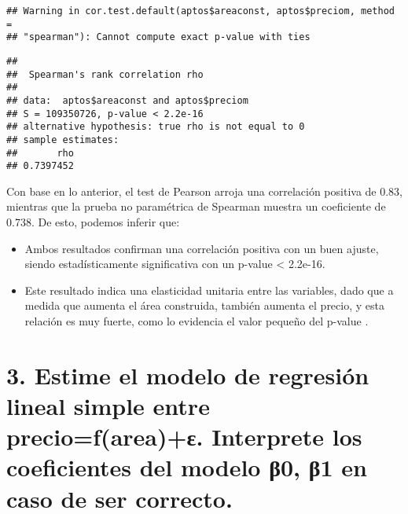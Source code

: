 \documentclass[
]{article}
\newenvironment{Shaded}{\begin{snugshade}}{\end{snugshade}}
\newcommand{\AttributeTok}[1]{\textcolor[rgb]{0.13,0.29,0.53}{#1}}
\newcommand{\FunctionTok}[1]{\textcolor[rgb]{0.13,0.29,0.53}{\textbf{#1}}}
\newcommand{\NormalTok}[1]{#1}
\newcommand{\SpecialCharTok}[1]{\textcolor[rgb]{0.81,0.36,0.00}{\textbf{#1}}}
\newcommand{\StringTok}[1]{\textcolor[rgb]{0.31,0.60,0.02}{#1}}
\providecommand{\tightlist}{%
  \setlength{\itemsep}{0pt}\setlength{\parskip}{0pt}}
\begin{document}
\begin{Shaded}
\end{Shaded}

\begin{verbatim}
## Warning in cor.test.default(aptos$areaconst, aptos$preciom, method =
## "spearman"): Cannot compute exact p-value with ties
\end{verbatim}

\begin{verbatim}
## 
##  Spearman's rank correlation rho
## 
## data:  aptos$areaconst and aptos$preciom
## S = 109350726, p-value < 2.2e-16
## alternative hypothesis: true rho is not equal to 0
## sample estimates:
##       rho 
## 0.7397452
\end{verbatim}

Con base en lo anterior, el test de Pearson arroja una correlación
positiva de 0.83, mientras que la prueba no paramétrica de Spearman
muestra un coeficiente de 0.738. De esto, podemos inferir que:

\begin{itemize}
\tightlist
\item
  Ambos resultados confirman una correlación positiva con un buen
  ajuste, siendo estadísticamente significativa con un p-value
  \textless{} 2.2e-16.
\item
  Este resultado indica una elasticidad unitaria entre las variables,
  dado que a medida que aumenta el área construida, también aumenta el
  precio, y esta relación es muy fuerte, como lo evidencia el valor
  pequeño del p-value .
\end{itemize}

\section{\texorpdfstring{\textbf{3. Estime el modelo de regresión lineal
simple entre precio=f(area)+ε. Interprete los coeficientes del modelo
β0, β1 en caso de ser
correcto.}}{3. Estime el modelo de regresión lineal simple entre precio=f(area)+ε. Interprete los coeficientes del modelo β0, β1 en caso de ser correcto.}}\label{estime-el-modelo-de-regresiuxf3n-lineal-simple-entre-preciofareaux3b5.-interprete-los-coeficientes-del-modelo-ux3b20-ux3b21-en-caso-de-ser-correcto.}
\end{document}
